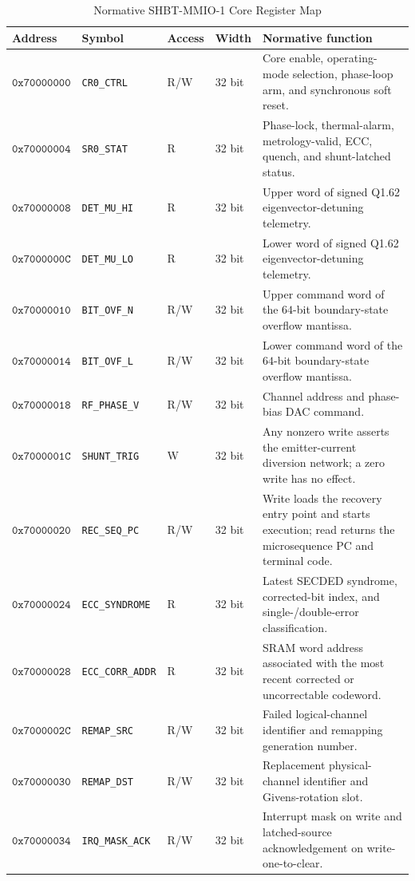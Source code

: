 \documentclass[10pt,twocolumn]{IEEEtran}
\begin{document}
\begin{table}[t]
\caption{Normative SHBT-MMIO-1 Core Register Map}
\label{tab:mmio_core_v1}
\centering
\footnotesize
\begin{tabular}{@{}llllp{8.2cm}@{}}
\toprule
Address & Symbol & Access & Width & Normative function \\
\midrule
$\mathtt{0x70000000}$ & \texttt{CR0\_CTRL} & R/W & 32 bit & Core enable, operating-mode selection, phase-loop arm, and synchronous soft reset. \\
$\mathtt{0x70000004}$ & \texttt{SR0\_STAT} & R & 32 bit & Phase-lock, thermal-alarm, metrology-valid, ECC, quench, and shunt-latched status. \\
$\mathtt{0x70000008}$ & \texttt{DET\_MU\_HI} & R & 32 bit & Upper word of signed Q1.62 eigenvector-detuning telemetry. \\
$\mathtt{0x7000000C}$ & \texttt{DET\_MU\_LO} & R & 32 bit & Lower word of signed Q1.62 eigenvector-detuning telemetry. \\
$\mathtt{0x70000010}$ & \texttt{BIT\_OVF\_N} & R/W & 32 bit & Upper command word of the $64$-bit boundary-state overflow mantissa. \\
$\mathtt{0x70000014}$ & \texttt{BIT\_OVF\_L} & R/W & 32 bit & Lower command word of the $64$-bit boundary-state overflow mantissa. \\
$\mathtt{0x70000018}$ & \texttt{RF\_PHASE\_V} & R/W & 32 bit & Channel address and phase-bias DAC command. \\
$\mathtt{0x7000001C}$ & \texttt{SHUNT\_TRIG} & W & 32 bit & Any nonzero write asserts the emitter-current diversion network; a zero write has no effect. \\
$\mathtt{0x70000020}$ & \texttt{REC\_SEQ\_PC} & R/W & 32 bit & Write loads the recovery entry point and starts execution; read returns the microsequence PC and terminal code. \\
$\mathtt{0x70000024}$ & \texttt{ECC\_SYNDROME} & R & 32 bit & Latest SECDED syndrome, corrected-bit index, and single-/double-error classification. \\
$\mathtt{0x70000028}$ & \texttt{ECC\_CORR\_ADDR} & R & 32 bit & SRAM word address associated with the most recent corrected or uncorrectable codeword. \\
$\mathtt{0x7000002C}$ & \texttt{REMAP\_SRC} & R/W & 32 bit & Failed logical-channel identifier and remapping generation number. \\
$\mathtt{0x70000030}$ & \texttt{REMAP\_DST} & R/W & 32 bit & Replacement physical-channel identifier and Givens-rotation slot. \\
$\mathtt{0x70000034}$ & \texttt{IRQ\_MASK\_ACK} & R/W & 32 bit & Interrupt mask on write and latched-source acknowledgement on write-one-to-clear. \\
\bottomrule
\end{tabular}
\end{table}
\end{document}
